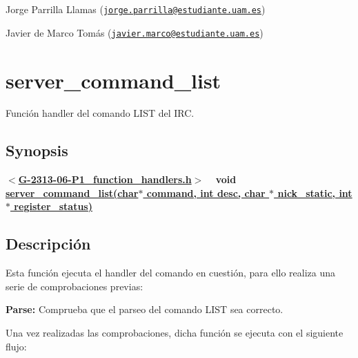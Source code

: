 \begin{DoxyItemize}
\item Jorge Parrilla Llamas (\href{mailto:jorge.parrilla@estudiante.uam.es}{\tt jorge.\+parrilla@estudiante.\+uam.\+es}) 
\item Javier de Marco Tomás (\href{mailto:javier.marco@estudiante.uam.es}{\tt javier.\+marco@estudiante.\+uam.\+es}) 
\end{DoxyItemize}\hypertarget{server_command_list}{}\section{server\+\_\+command\+\_\+list}\label{server_command_list}
Función handler del comando L\+I\+S\+T del I\+R\+C.\hypertarget{server_command_list_synopsis_list}{}\subsection{Synopsis}\label{server_command_list_synopsis_list}
{ {\bfseries $<$\hyperlink{G-2313-06-P1__function__handlers_8h}{G-\/2313-\/06-\/\+P1\+\_\+function\+\_\+handlers.\+h}$>$} ~\newline
 {\bfseries void \hyperlink{G-2313-06-P1__function__handlers_8c_af289e3cc397e24e9b8c12c35bce68285}{server\+\_\+command\+\_\+list(char$\ast$ command, int desc, char $\ast$ nick\+\_\+static, int$\ast$ register\+\_\+status)}} } \hypertarget{server_command_list_descripcion_list}{}\subsection{Descripción}\label{server_command_list_descripcion_list}
Esta función ejecuta el handler del comando en cuestión, para ello realiza una serie de comprobaciones previas\+:


\begin{DoxyItemize}
\item {\bfseries Parse\+:} Comprueba que el parseo del comando L\+I\+S\+T sea correcto. 
\end{DoxyItemize}

Una vez realizadas las comprobaciones, dicha función se ejecuta con el siguiente flujo\+:


